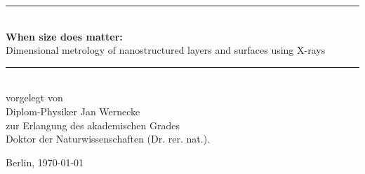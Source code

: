 
\begin{titlepage}
\begin{center}

    \vspace*{0.2\paperheight}

    \rule{\linewidth}{0.5mm} \\[0.4cm]
    {\huge\bfseries\sffamily When size does matter:} \\[1ex]
    {\LARGE\sffamily Dimensional metrology of nanostructured layers and surfaces using X-rays} \\
    \rule{\linewidth}{0.5mm} \\[4cm]


    {\sffamily%
    vorgelegt von \\Diplom-Physiker Jan Wernecke \\zur Erlangung des akademischen Grades \\Doktor der Naturwissenschaften (Dr. rer. nat.).}

    \vfill
    {%
    \sffamily%
    \begin{otherlanguage}{ngerman}
        Berlin, \today
    \end{otherlanguage}
    }
\end{center}
\end{titlepage}

